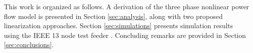 
This work is organized as follows. A derivation of the three phase nonlinear power flow model is presented in Section \ref{sec:analysis}, along with two proposed linearization approaches.  Section \ref{sec:simulations} presents simulation results using the IEEE 13 node test feeder \cite{IEEEtestfeeder}.  Concluding remarks are provided in Section \ref{sec:conclusions}.  

